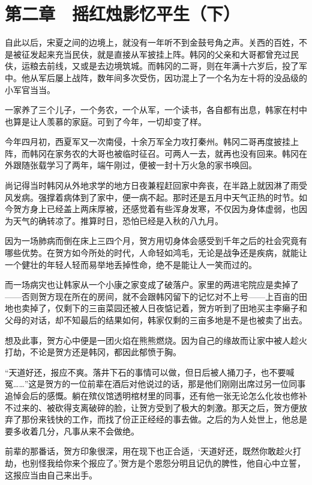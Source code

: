 \section{第二章　摇红烛影忆平生（下）}

自此以后，宋夏之间的边境上，就没有一年听不到金鼓号角之声。关西的百姓，不是被征发起来充当民伕，就是直接从军披挂上阵。韩冈的父亲和大哥都曾充过民伕，运粮去前线，又或是去边境筑城。而韩冈的二哥，则在年满十六岁后，投了军中。他从军后屡上战阵，数年间多次受伤，因功混上了一个名为左十将的没品级的小军官当当。

一家养了三个儿子，一个务农，一个从军，一个读书，各自都有出息，韩家在村中也算是让人羡慕的家庭。可到了今年，一切却变了样。

今年四月初，西夏军又一次南侵，十余万军全力攻打秦州。韩冈二哥再度披挂上阵，而韩冈在家务农的大哥也被临时征召。可两人一去，就再也没有回来。韩冈在外跟随张载学习了两年，端午刚过，便被一封十万火急的家书唤回。

尚记得当时韩冈从外地求学的地方日夜兼程赶回家中奔丧，在半路上就因淋了雨受风发病。强撑着病体到了家中，便一病不起。那时还是五月中天气正热的时节。如今贺方身上已经盖上两床厚被，还感觉着有些浑身发寒，不仅因为身体虚弱，也因为天气的确转凉了。推算时日，恐怕已经是入秋的八九月。

因为一场肺病而倒在床上三四个月，贺方用切身体会感受到千年之后的社会究竟有哪些优势。在贺方如今所处的时代，人命轻如鸿毛，无论是战争还是疾病，就能让一个健壮的年轻人轻而易举地丢掉性命，绝不是能让人一笑而过的。

而一场病灾也让韩家从一个小康之家变成了破落户。家里的两进宅院应是卖掉了——否则贺方现在所在的房间，就不会跟韩冈留下的记忆对不上号——上百亩的田地也卖掉了，仅剩下的三亩菜园还被人日夜惦记着，贺方听到了田地买主李癞子和父母的对话，却不知最后的结果如何，韩家仅剩的三亩多地是不是也被卖了出去。

想及此事，贺方心中便是一团火焰在熊熊燃烧。因为自己的缘故而让家中被人趁火打劫，不论是贺方还是韩冈，都因此郁愤于胸。

“天道好还，报应不爽。落井下石的事情可以做，但日后被人捅刀子，也不要喊冤……”这是贺方的一位前辈在酒后对他说过的话，那是他们刚刚出席过另一位同事追悼会后的感慨。躺在殡仪馆透明棺材里的同事，还有他一张无论怎么化妆也修补不过来的、被砍得支离破碎的脸，让贺方受到了极大的刺激。那天之后，贺方便放弃了那份来钱快的工作，而找了份正正经经的事去做。之后的为人处世上，他总是要多收着几分，凡事从来不会做绝。

前辈的那番话，贺方印象很深，用在现下也正合适，‘天道好还，既然你敢趁火打劫，也别怪我给你来个报应了。’贺方是个恩怨分明且记仇的脾性，他自心中立誓，这报应当由自己来出手。

